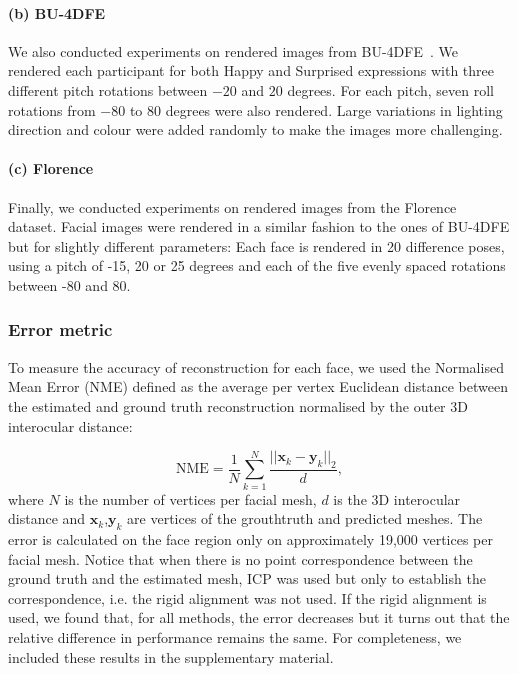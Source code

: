 \paragraph{(b) BU-4DFE} We also conducted experiments
on rendered images from BU-4DFE~\cite{yin2008high}. We rendered each
participant for both Happy and Surprised expressions with three
different pitch rotations between $-20$ and $20$ degrees. For each
pitch, seven roll rotations from $-80$ to $80$ degrees were also
rendered. Large variations in lighting direction and colour were added
randomly to make the images more challenging.

\paragraph{(c) Florence}
Finally, we conducted experiments on rendered images from the
Florence~\cite{masi2d3dFaceData} dataset. Facial images were rendered
in a similar fashion to the ones of BU-4DFE but for slightly different
parameters: Each face is rendered in 20 difference poses, using a
pitch of -15, 20 or 25 degrees and each of the five evenly spaced
rotations between -80 and 80.

\subsubsection{Error metric} To measure the accuracy of reconstruction for
each face, we used the Normalised Mean Error (NME) defined as the
average per vertex Euclidean distance between the estimated and ground
truth reconstruction normalised by the outer 3D interocular distance:

\begin{equation}
  \textrm{NME} = \frac{1}{N} \sum_{k=1}^{N} \frac{||\mathbf{x}_k-\mathbf{y}_{k} ||_{2} }{d}, \label{eq:err}
\end{equation}
where $N$ is the number of vertices per facial mesh, $d$ is the 3D
interocular distance and $\mathbf{x}_k$,$\mathbf{y}_k$ are vertices of
the grouthtruth and predicted meshes. The error is calculated on the
face region only on approximately 19,000 vertices per facial
mesh. Notice that when there is no point correspondence between the
ground truth and the estimated mesh, ICP was used but only to
establish the correspondence, i.e. the rigid alignment was not
used. If the rigid alignment is used, we found that, for all methods,
the error decreases but it turns out that the relative difference in
performance remains the same. For completeness, we included these
results in the supplementary material.

